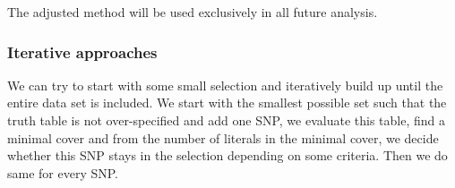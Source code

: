 \documentclass[letterpaper, 11pt]{article}
\begin{document}
\begin{figure}[h] 

\end{figure}

The adjusted method will be used exclusively in all future analysis. 

\subsubsection{Iterative approaches}
We can try to start with some small selection and iteratively build up until the entire data set is included. We start with the smallest possible set such that the truth table is not over-specified and add one SNP, we evaluate this table, find a minimal cover and from the number of literals in the minimal cover, we decide whether this SNP stays in the selection depending on some criteria. Then we do same for every SNP. 

\begin{figure} [!h] 
\end{figure}
\end{document}
